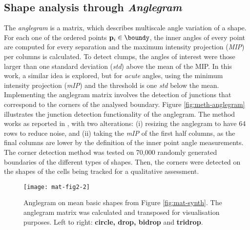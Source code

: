 \subsection{Shape analysis through \emph{Anglegram}}
The \emph{anglegram} \cite{solislemus2017} is a matrix, which describes multiscale
angle variation of a shape.
For each one of the ordered points $\mathbf{p}_i\in\boundy$,
the inner angles of every point are computed for every separation and the maximum
intensity projection (\emph{MIP}) per columns is calculated.
To detect clumps, the angles of interest were those larger than %
one standard deviation (\emph{std}) above the mean of the MIP.
In this work, a similar idea is explored, but for \emph{acute} angles,
using the minimum intensity projection (\emph{mIP}) and the threshold is
one \emph{std} below the mean.
Implementing the anglegram matrix involves the detection
of junctions that correspond to the corners of the analysed boundary.
Figure \ref{fig:meth-anglegram} illustrates the junction detection functionality
of the anglegram. The method works as reported in \cite{solislemus2017}, with
two alterations: (i) resizing the anglegram to have 64 rows to reduce noise,
and (ii) taking the \emph{mIP} of the first half
columns, as the final columns are lower by the definition of the inner point
angle measurements. The corner detection method was tested on 70,000 randomly
generated boundaries of the different types of shapes. Then, the corners were
detected on the shapes of the cells being tracked for a qualitative assessment.
\begin{figure}[hbpt]
    \centering
    \texttt{[image: mat-fig2-2]}
    \caption[Anglegram on mean basic shapes from Figure \ref{fig:mat-synth}.]
    {\small
    Anglegram on mean basic shapes from Figure \ref{fig:mat-synth}.
    The anglegram matrix was calculated and transposed for visualisation
    purposes. %
    Left to right: \textbf{circle, drop, bidrop} and
    \textbf{tridrop}.
    }
    \label{fig:agshapes}
\end{figure}
\vspace{-0.5em}
